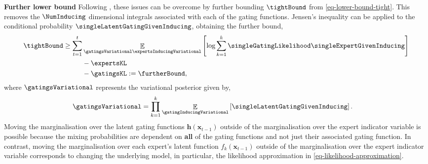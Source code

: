 \documentclass{mimosis-class/mimosis}
\numberwithin{equation}{chapter}
\DeclareMathOperator{\E}{\mathbb{E}}
\newcommand{\numData}{\ensuremath{t}}
\newcommand{\modeInd}{\ensuremath{k}}
\newcommand{\NumData}{\ensuremath{\MakeUppercase{\numData}}}
\newcommand{\ModeInd}{\ensuremath{\MakeUppercase{\modeInd}}}
\newcommand{\mode}[1]{\ensuremath{#1_{\modeInd}}}
\newcommand{\x}{\ensuremath{\mathbf{x}}}
\newcommand{\singleInput}{\ensuremath{\x_{\numData-1}}}
\newcommand{\gatingFunc}{\ensuremath{h}}
\newcommand{\GatingFunc}{\ensuremath{\mathbf{\gatingFunc}}}
\newcommand{\latentFunc}{\ensuremath{f}}
\begin{document}
{\textbf{Further lower bound} Following \cite{hensmanScalable2015}, these issues can be overcome
by further bounding \(\tightBound\) from \cref{eq-lower-bound-tight}.
This removes the \(\NumInducing\) dimensional integrals associated with each of the gating functions.
Jensen's inequality can be applied to the conditional probability \(\singleLatentGatingGivenInducing\),
obtaining the further bound,
\begin{align} \label{eq-lower-bound-further}
\tightBound \geq \sum_{\numData=1}^\NumData &\E_{\gatingsVariational \expertsInducingVariational}
\left[ \text{log} \sum_{\modeInd=1}^{\ModeInd} \singleGatingLikelihood \singleExpertGivenInducing \right] \nonumber \\
&- \expertsKL \nonumber \\
&- \gatingsKL := \furtherBound,
\end{align}
where \(\gatingsVariational\) represents the variational posterior given by,
\begin{align} \label{eq-variational-posteriors-gating}
\gatingsVariational &= \prod_{\modeInd=1}^\ModeInd \E_{\gatingInducingVariational} \left[ \singleLatentGatingGivenInducing \right].
\end{align}
Moving the marginalisation over the latent gating functions \(\GatingFunc(\singleInput)\)
outside of the marginalisation over the expert indicator
variable is possible because the mixing probabilities are dependent on \textbf{all} of the gating functions and
not just their associated gating function.
In contrast, moving the marginalisation over each expert's latent function \(\mode{\latentFunc}(\singleInput)\)
outside of the marginalisation over the expert
indicator variable corresponds to changing the underlying model, in particular, the likelihood
approximation in \cref{eq-likelihood-approximation}.

}
\end{document}
